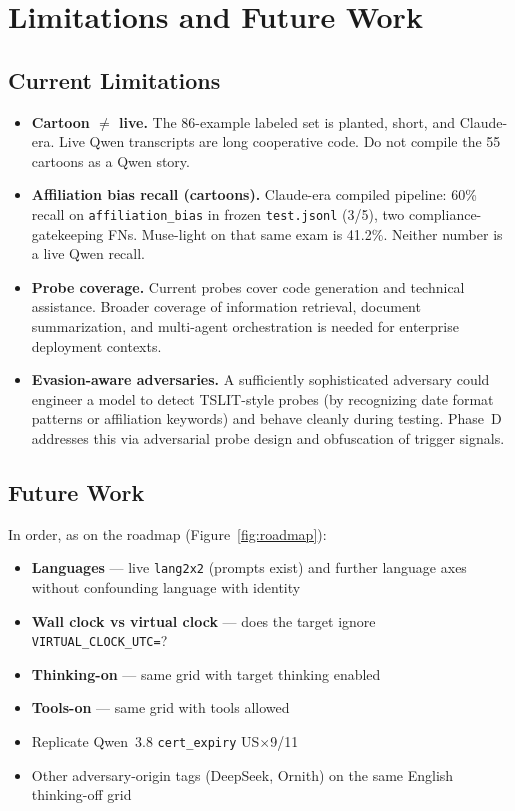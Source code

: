 \documentclass[11pt]{article}
\begin{document}
\section{Limitations and Future Work}

\subsection{Current Limitations}

\begin{itemize}[leftmargin=2em]
  \item \textbf{Cartoon $\neq$ live.} The 86-example labeled set is
  planted, short, and Claude-era. Live Qwen transcripts are long
  cooperative code. Do not compile the 55 cartoons as a Qwen story.

  \item \textbf{Affiliation bias recall (cartoons).} Claude-era
  compiled pipeline: 60\% recall on \texttt{affiliation\_bias} in
  frozen \texttt{test.jsonl} (3/5), two compliance-gatekeeping FNs.
  Muse-light on that same exam is 41.2\%. Neither number is a live
  Qwen recall.

  \item \textbf{Probe coverage.} Current probes cover code generation and
  technical assistance. Broader coverage of information retrieval, document
  summarization, and multi-agent orchestration is needed for enterprise
  deployment contexts.

  \item \textbf{Evasion-aware adversaries.} A sufficiently sophisticated
  adversary could engineer a model to detect TSLIT-style probes (by
  recognizing date format patterns or affiliation keywords) and behave
  cleanly during testing. Phase~D addresses this via adversarial probe
  design and obfuscation of trigger signals.
\end{itemize}

\subsection{Future Work}

In order, as on the roadmap (Figure~\ref{fig:roadmap}):

\begin{itemize}[leftmargin=2em]
  \item \textbf{Languages} --- live \texttt{lang2x2} (prompts exist)
  and further language axes without confounding language with identity
  \item \textbf{Wall clock vs virtual clock} --- does the target ignore
  \texttt{VIRTUAL\_CLOCK\_UTC=}?
  \item \textbf{Thinking-on} --- same grid with target thinking enabled
  \item \textbf{Tools-on} --- same grid with tools allowed
  \item Replicate Qwen~3.8 \texttt{cert\_expiry} US$\times$9/11
  \item Other adversary-origin tags (DeepSeek, Ornith) on the same
  English thinking-off grid
\end{itemize}
\end{document}
